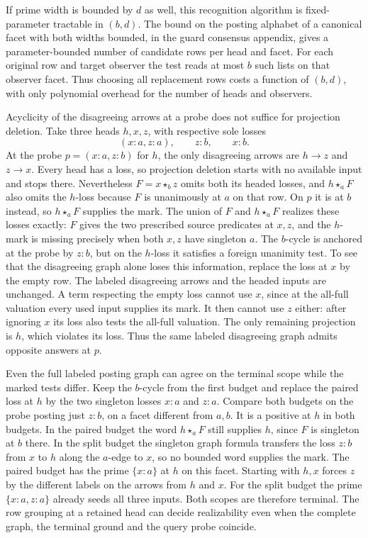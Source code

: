 If prime width is bounded by $d$ as well,
this recognition algorithm is fixed-parameter
tractable in $(b,d)$. The bound on the
posting alphabet of a canonical facet with
both widths bounded, in the guard consensus
appendix, gives a parameter-bounded number
of candidate rows per head and facet. For
each original row and target observer the
test reads at most $b$ such lists on that
observer facet. Thus choosing all replacement
rows costs a function of $(b,d)$, with
only polynomial overhead for the number
of heads and observers.

Acyclicity of the disagreeing arrows at a probe does
not suffice for projection deletion. Take three heads
$h,x,z$, with respective sole losses
\[
             (x{:}a,z{:}a),\qquad z{:}b,\qquad x{:}b .
\]
At the probe $p=(x{:}a,z{:}b)$ for $h$, the only
disagreeing arrows are $h\to z$ and $z\to x$. Every
head has a loss, so projection deletion starts with
no available input and stops there. Nevertheless
$F=x\star_b z$ omits both its headed losses, and
$h\star_a F$ also omits the $h$-loss because $F$
is unanimously at $a$ on that row. On $p$ it is at
$b$ instead, so $h\star_a F$ supplies the mark.
The union of $F$ and $h\star_a F$ realizes these
losses exactly: $F$ gives the two prescribed source
predicates at $x,z$, and the $h$-mark is missing
precisely when both $x,z$ have singleton $a$.
The $b$-cycle is anchored at the probe by $z{:}b$,
but on the $h$-loss it satisfies a foreign unanimity
test. To see that the disagreeing graph alone loses
this information, replace the loss at $x$ by the
empty row. The labeled disagreeing arrows and the
headed inputs are unchanged. A term respecting the
empty loss cannot use $x$, since at the all-full
valuation every used input supplies its mark. It
then cannot use $z$ either: after ignoring $x$ its
loss also tests the all-full valuation. The only
remaining projection is $h$, which violates its loss.
Thus the same labeled disagreeing graph admits
opposite answers at $p$.

Even the full labeled posting graph can agree on
the terminal scope while the marked tests differ.
Keep the $b$-cycle from the first budget and replace
the paired loss at $h$ by the two singleton losses
$x{:}a$ and $z{:}a$. Compare both budgets on the probe
posting just $z{:}b$, on a facet different from
$a,b$. It is a positive at $h$ in both budgets.
In the paired budget the word $h\star_a F$ still
supplies $h$, since $F$ is singleton at $b$ there.
In the split budget the singleton graph formula
transfers the loss $z{:}b$ from $x$ to $h$ along
the $a$-edge to $x$, so no bounded word supplies
the mark. The paired budget has the prime
$\{x{:}a\}$ at $h$ on this facet. Starting with
$h,x$ forces $z$ by the different labels on the
arrows from $h$ and $x$. For the split budget the
prime $\{x{:}a,z{:}a\}$ already seeds all three
inputs. Both scopes are therefore terminal.
The row grouping at a retained head can decide
realizability even when the complete graph,
the terminal ground and the query probe coincide.

